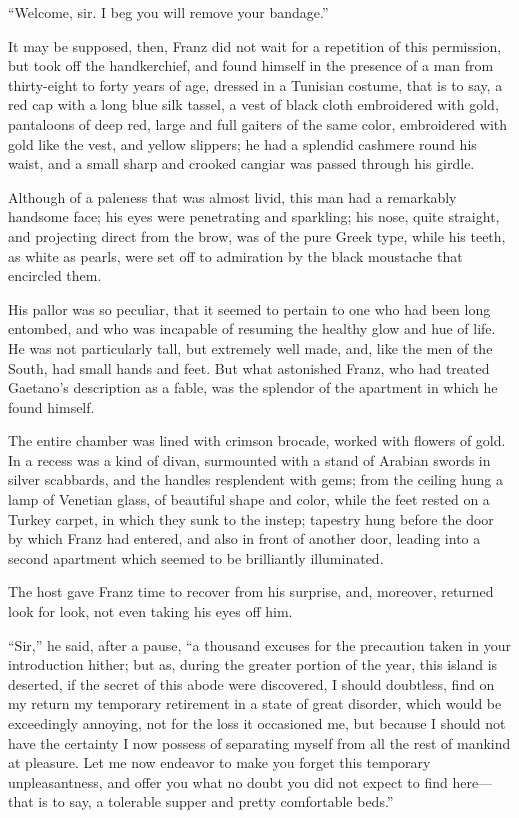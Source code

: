 “Welcome, sir. I beg you will remove your bandage.”

It may be supposed, then, Franz did not wait for a repetition of this
permission, but took off the handkerchief, and found himself in the
presence of a man from thirty-eight to forty years of age, dressed in a
Tunisian costume, that is to say, a red cap with a long blue silk
tassel, a vest of black cloth embroidered with gold, pantaloons of deep
red, large and full gaiters of the same color, embroidered with gold
like the vest, and yellow slippers; he had a splendid cashmere round
his waist, and a small sharp and crooked cangiar was passed through his
girdle.

Although of a paleness that was almost livid, this man had a remarkably
handsome face; his eyes were penetrating and sparkling; his nose, quite
straight, and projecting direct from the brow, was of the pure Greek
type, while his teeth, as white as pearls, were set off to admiration
by the black moustache that encircled them.

His pallor was so peculiar, that it seemed to pertain to one who had
been long entombed, and who was incapable of resuming the healthy glow
and hue of life. He was not particularly tall, but extremely well made,
and, like the men of the South, had small hands and feet. But what
astonished Franz, who had treated Gaetano’s description as a fable, was
the splendor of the apartment in which he found himself.

The entire chamber was lined with crimson brocade, worked with flowers
of gold. In a recess was a kind of divan, surmounted with a stand of
Arabian swords in silver scabbards, and the handles resplendent with
gems; from the ceiling hung a lamp of Venetian glass, of beautiful
shape and color, while the feet rested on a Turkey carpet, in which
they sunk to the instep; tapestry hung before the door by which Franz
had entered, and also in front of another door, leading into a second
apartment which seemed to be brilliantly illuminated.

The host gave Franz time to recover from his surprise, and, moreover,
returned look for look, not even taking his eyes off him.

“Sir,” he said, after a pause, “a thousand excuses for the precaution
taken in your introduction hither; but as, during the greater portion
of the year, this island is deserted, if the secret of this abode were
discovered, I should doubtless, find on my return my temporary
retirement in a state of great disorder, which would be exceedingly
annoying, not for the loss it occasioned me, but because I should not
have the certainty I now possess of separating myself from all the rest
of mankind at pleasure. Let me now endeavor to make you forget this
temporary unpleasantness, and offer you what no doubt you did not
expect to find here—that is to say, a tolerable supper and pretty
comfortable beds.”


